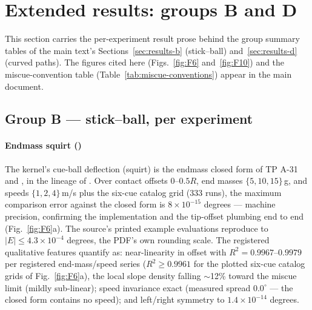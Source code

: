 \section{Extended results: groups B and D}
\label{sec:supp-extended-results}

This section carries the per-experiment result prose behind the group
summary tables of the main text's Sections~\ref{sec:results-b}
(stick--ball) and~\ref{sec:results-d} (curved paths). The figures cited
here (Figs.~\ref{fig:F6} and~\ref{fig:F10}) and the miscue-convention
table (Table~\ref{tab:miscue-conventions}) appear in the main document.

\subsection{Group B --- stick--ball, per experiment}
\label{sec:supp-results-b}

\paragraph{Endmass squirt ()}
The kernel's cue-ball deflection (squirt) is the endmass closed form of
TP A-31 \citep{alciatore_tp_a31} and \citet{cross2008squirt}, in the
lineage of \citet{shepard2001squirt}. Over contact offsets $0$--$0.5R$,
end masses $\{5, 10, 15\}$\,g, and speeds $\{1, 2, 4\}$\,m/s plus the
six-cue catalog grid (333 runs), the maximum comparison error against
the closed form is $8 \times 10^{-15}$ degrees --- machine precision,
confirming the implementation and the tip-offset plumbing end to end
(Fig.~\ref{fig:F6}a). The source's printed example evaluations reproduce
to $|E| \le 4.3 \times 10^{-4}$ degrees, the PDF's own rounding scale.
The registered qualitative features quantify as: near-linearity in
offset with $R^2 = 0.9967$--$0.9979$ per registered end-mass/speed
series ($R^2 \geq 0.9961$ for the plotted six-cue catalog grids of
Fig.~\ref{fig:F6}a), the local slope
density falling $\sim$12\% toward the miscue limit (mildly sub-linear);
speed invariance exact (measured spread $0.0^\circ$ --- the closed form
contains no speed); and left/right symmetry to $1.4 \times 10^{-14}$
degrees.

